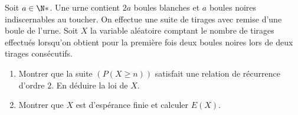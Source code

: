 \begin{enonce}
\begin{exercise}[ID={RMS126 E530},subtitle={Mines-Ponts PSI 2015},tags={}, difficulty={0}]
Soit $a\in\N*$.
Une urne contient $2a$ boules blanches et $a$ boules noires indiscernables au toucher.
On effectue une suite de tirages avec remise d'une boule de l'urne.
Soit $X$ la variable aléatoire comptant le nombre de tirages effectués lorsqu'on obtient pour la première fois deux boules noires lors de deux tirages consécutifs.
\begin{enumerate}
  \item Montrer que la suite $\left( P\left( X\geq n \right)  \right)$ satisfait une relation de récurrence d'ordre $2$.
    En déduire la loi de $X$.

  \item Montrer que $X$ est d'espérance finie et calculer $E(X)$.
\end{enumerate}
\end{exercise}
\begin{solution}
\end{solution}
\end{enonce}
